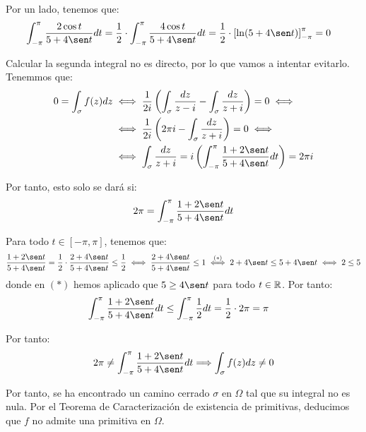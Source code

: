 \begin{ejercicio}
    Por un lado, tenemos que:
    \begin{align*}
        \int_{-\pi}^{\pi} \frac{2\cos t}{{5+4\sen t}}dt
        &= \dfrac{1}{2}\cdot \int_{-\pi}^{\pi} \frac{4\cos t}{{5+4\sen t}}dt
        = \dfrac{1}{2}\cdot \left[\ln(5+4\sen t)\right]_{-\pi}^{\pi}
        = 0
    \end{align*}

    Calcular la segunda integral no es directo, por lo que vamos a intentar evitarlo. Tenemmos que:
    \begin{align*}
        0 = \int_{\sigma} f(z)dz &\iff  \dfrac{1}{2i}\left(\int_{\sigma} \frac{dz}{z-i} - \int_{\sigma} \frac{dz}{z+i}\right) = 0\iff
        \\&\iff \dfrac{1}{2i}\left(2\pi i-\int_{\sigma} \frac{dz}{z+i}\right) = 0\iff
        \\&\iff \int_{\sigma} \frac{dz}{z+i} = i\left(\int_{-\pi}^{\pi} \frac{1+2\sen t}{{5+4\sen t}}dt\right) = 2\pi i
    \end{align*}

    Por tanto, esto solo se dará si:
    \begin{equation*}
        2\pi = \int_{-\pi}^{\pi} \frac{1+2\sen t}{{5+4\sen t}}dt
    \end{equation*}

    Para todo $t \in [-\pi,\pi]$, tenemos que:
    \begin{align*}
        \frac{1+2\sen t}{{5+4\sen t}}=\dfrac{1}{2}\cdot \frac{2+4\sen t}{{5+4\sen t}}\leq \dfrac{1}{2}
        \iff \frac{2+4\sen t}{{5+4\sen t}}\leq 1\stackrel{(\ast)}{\iff} 2+4\sen t\leq 5+4\sen t\iff 2\leq 5
    \end{align*}
    donde en $(\ast)$ hemos aplicado que $5\geq 4\sen t$ para todo $t \in \mathbb{R}$.
    Por tanto:
    \begin{align*}
        \int_{-\pi}^{\pi} \frac{1+2\sen t}{{5+4\sen t}}dt &\leq \int_{-\pi}^{\pi} \frac{1}{2}dt
        = \dfrac{1}{2}\cdot 2\pi = \pi
    \end{align*}

    Por tanto:
    \begin{align*}
        2\pi \neq \int_{-\pi}^{\pi} \frac{1+2\sen t}{{5+4\sen t}}dt
        \Longrightarrow
        \int_{\sigma} f(z)dz \neq 0
    \end{align*}

    Por tanto, se ha encontrado un camino cerrado $\sigma$ en $\Omega$ tal que su integral no es nula. Por el Teorema de Caracterización de existencia de primitivas, deducimos que $f$ no admite una primitiva en $\Omega$.
\end{ejercicio}

